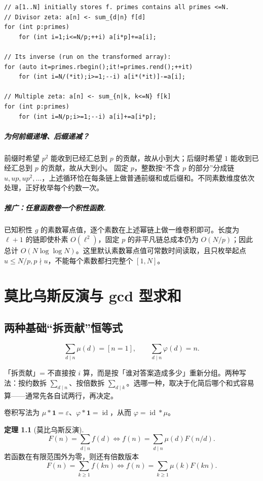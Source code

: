 \documentclass[UTF8,a4paper,11pt,oneside,openany,fontset=fandol]{ctexbook}
\theoremstyle{definition}
\newtheorem{theorem}[definition]{定理}
\newcommand{\eps}{\varepsilon}
\newcommand{\one}{\mathbf 1}
\newcommand{\id}{\operatorname{id}}
\begin{document}
\begin{lstlisting}
// a[1..N] initially stores f. primes contains all primes <=N.
// Divisor zeta: a[n] <- sum_{d|n} f[d]
for (int p:primes)
    for (int i=1;i<=N/p;++i) a[i*p]+=a[i];

// Its inverse (run on the transformed array):
for (auto it=primes.rbegin();it!=primes.rend();++it)
    for (int i=N/(*it);i>=1;--i) a[i*(*it)]-=a[i];

// Multiple zeta: a[n] <- sum_{n|k, k<=N} f[k]
for (int p:primes)
    for (int i=N/p;i>=1;--i) a[i]+=a[i*p];
\end{lstlisting}
\paragraph{为何前缀递增、后缀递减？}
前缀时希望 $p^2$ 能收到已经汇总到 $p$ 的贡献，故从小到大；后缀时希望 $1$ 能收到已经汇总到 $p$ 的贡献，故从大到小。
固定 $p$，整数按“不含 $p$ 的部分”分成链 $u,up,up^2,\ldots$，上述循环恰在每条链上做普通前缀和或后缀和。不同素数维度依次处理，正好枚举每个约数一次。

\paragraph{推广：任意函数卷一个积性函数.}
已知积性 $g$ 的素数幂点值，逐个素数在上述幂链上做一维卷积即可。长度为 $\ell+1$ 的链即使朴素 $O(\ell^2)$，固定 $p$ 的非平凡链总成本仍为 $O(N/p)$；因此总计 $O(N\log\log N)$。这里默认素数幂点值可常数时间读取，且只枚举起点 $u\le N/p,p\nmid u$，不能每个素数都扫完整个 $[1,N]$。



\chapter{莫比乌斯反演与 gcd 型求和}
\section{两种基础“拆贡献”恒等式}
\[
\sum_{d\mid n}\mu(d)=[n=1],\qquad
\sum_{d\mid n}\varphi(d)=n.
\]

\begin{tip}
「拆贡献」= 不直接按 $i$ 算，而是按「谁对答案造成多少」重新分组。两种写法：按约数拆 $\sum_{d\mid n}$、按倍数拆 $\sum_{d\mid k}$。选哪一种，取决于化简后哪个和式容易算——通常先各自试两行，再决定。
\end{tip}

卷积写法为 $\mu*\one=\eps$、$\varphi*\one=\id$，从而 $\varphi=\id*\mu$。
\begin{theorem}[莫比乌斯反演]
\[
 F(n)=\sum_{d\mid n}f(d)
 \iff f(n)=\sum_{d\mid n}\mu(d)F(n/d).
\]
若函数在有限范围外为零，则还有倍数版本
\[
 F(n)=\sum_{k\ge1}f(kn)
 \iff f(n)=\sum_{k\ge1}\mu(k)F(kn).
\]
\end{theorem}
\end{document}

